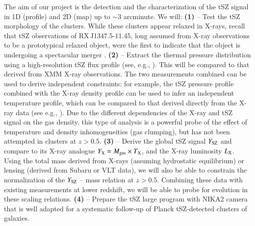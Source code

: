 \documentclass[11pt,a4paper,twoside,graphicx,color]{article}
\begin{document}
\vspace{-0.3cm} 
The aim of our project is the detection and the characterization of the tSZ signal in 1D (profile) and 2D (map) up to $\sim 3$ arcminute. We will:
{{\bf (1)} -- Test the tSZ morphology of the clusters. While these clusters appear relaxed in X-rays, recall that tSZ observations of RX\,J1347.5-11.45, long assumed from X-ray observations to be a prototypical relaxed object, were the first to indicate that the object is undergoing a spectacular merger \cite{poi99,kom99}. 
{\bf (2)} -- Extract the thermal pressure distribution using a high-resolution tSZ flux profile (see, e.g., \cite{adam2013}). This will be compared to that derived from XMM X-ray observations. The two measurements combined can be used to derive independent constraints: for example, the tSZ pressure profile combined with the X-ray density profile can be used to infer an independent  temperature profile, which can be compared to that derived directly from the X-ray data (see e.g., \cite{bas10}). Due to the different dependencies of the X-ray and tSZ signal on the gas density, this type of analysis is a powerful probe of the effect of temperature and density inhomogeneities (gas clumping), but has not been attempted in clusters at $z>0.5$. 
{\bf (3)} -- Derive the global tSZ signal $Y_{\rm SZ}$ and compare to its X-ray analogue $Y_{\rm X} = M_{\rm gas}\times T_{\rm X}$, and the X-ray luminosity $L_{\rm X}$. Using the total mass derived from X-rays (assuming hydrostatic equilibrium) or lensing (derived from Subaru or VLT data), we will also be able to constrain the normalization of the $Y_{\rm SZ}$ -- mass relation at $z>0.5$. Combining these data with existing measurements at lower redshift, we will be able to probe for evolution in these scaling relations. 
{\bf (4)} -- Prepare the tSZ large program with NIKA2 camera that is well adapted for a systematic follow-up of Planck tSZ-detected clusters of galaxies.\\
}
\end{document}
